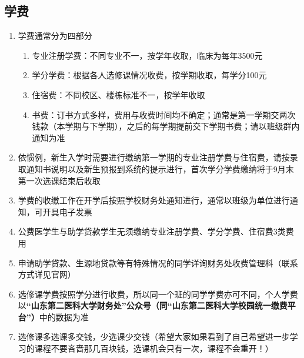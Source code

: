 \subsection[学费]{学费\footnotemark}
\label{tuition}
\begin{enumerate}
    \item 学费通常分为四部分\footnotemark
          \begin{enumerate}
              \item 专业注册学费：不同专业不一，按学年收取，临床为每年3500元
              \item 学分学费：根据各人选修课情况收费，按学期收取，每学分100元
              \item 住宿费：不同校区、楼栋标准不一，按学年收取
              \item 书费：订书方式多样，费用与收费时间均不确定；通常是第一学期交两次钱款（本学期与下学期），之后的每学期提前交下学期书费；请以班级群内通知为准
          \end{enumerate}
    \item 依惯例，新生入学时需要进行缴纳第一学期的专业注册学费与住宿费，请按录取通知书说明以及新生预报到系统\footnotemark 的提示进行，首次学分学费缴纳将于9月末第一次选课结束后收取
    \item 学费的收缴工作在开学后按照学校财务处通知进行，通常以班级为单位进行通知，可开具电子发票
    \item 公费医学生与助学贷款学生无须缴纳专业注册学费、学分学费、住宿费3类费用
    \item 申请助学贷款、生源地贷款等有特殊情况的同学详询财务处收费管理科（联系方式详见官网）
    \item 选修课学费按照学分进行收费，所以同一个班的同学学费亦可不同，个人学费以\textbf{“山东第二医科大学财务处”公众号（同“山东第二医科大学校园统一缴费平台”）}中的数据为准
    \item 选修课多选课多交钱，少选课少交钱（希望大家如果看到了自己希望进一步学习的课程不要吝啬那几百块钱，选课机会只有一次，课程不会重开！）
\end{enumerate}

